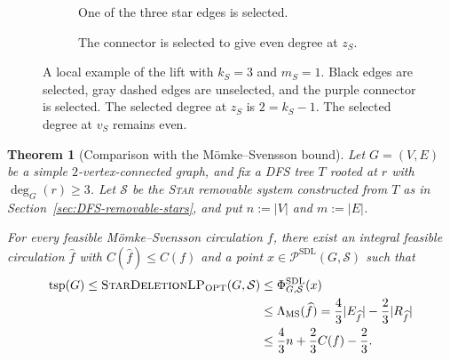 \documentclass[11pt]{amsart}
\newcommand{\1}{\mathbbm{1}}
\newcommand{\LPone}{\textsc{StarDeletionLP}}
\newcommand{\Pone}{\mathcal P^{\mathrm{SDL}}}
\newcommand{\PhiOne}{\Phi^{\mathrm{SDL}}}
\newtheorem{theorem}{Theorem}[section]
\begin{document}
\begin{figure}[H]
\centering
\begin{subfigure}[t]{.46\textwidth}
\centering
{}
\caption{One of the three star edges is selected.}
\end{subfigure}\hfill
\begin{subfigure}[t]{.46\textwidth}
\centering
{}
\caption{The connector is selected to give even degree at $z_S$.}
\end{subfigure}
\caption{A local example of the lift with $k_S=3$ and $m_S=1$.
Black edges are selected, gray dashed edges are unselected, and the
purple connector is selected. The selected degree at $z_S$ is
$2=k_S-1$. The selected degree at $v_S$ remains even.}
\label{fig:framework-1-lift}
\end{figure}


\begin{theorem}[Comparison with the M\"omke--Svensson bound]
\label{thm:MS-to-framework-1}
\label{thm:framework-1-dominates-MS-allflows}
Let $G=(V,E)$ be a simple $2$-vertex-connected graph, and fix
a DFS tree $T$ rooted at $r$ with $\deg_G(r)\ge3$.
Let $\mathcal S$ be the \textsc{Star} removable system constructed
from $T$ as in Section~\ref{sec:DFS-removable-stars}, and put
$n:=|V|$ and $m:=|E|$.

For every feasible M\"omke--Svensson circulation $f$, there
exist an integral feasible circulation $\widehat f$ with
$C(\widehat f)\le C(f)$ and a point
$x\in\Pone(G,\mathcal S)$ such that
\[
\begin{aligned}
 \operatorname{tsp}(G)
 \le \text{\LPone}_{\mathrm{OPT}}(G,\mathcal S)
 &\le \PhiOne_{G,\mathcal S}(x)\\
 &\le \Lambda_{\mathrm{MS}}(\widehat f)
 =\frac43|E_{\widehat f}|-\frac23|R_{\widehat f}|\\
 &\le \frac43n+\frac23C(f)-\frac23.
\end{aligned}
\]

\end{theorem}
\end{document}
